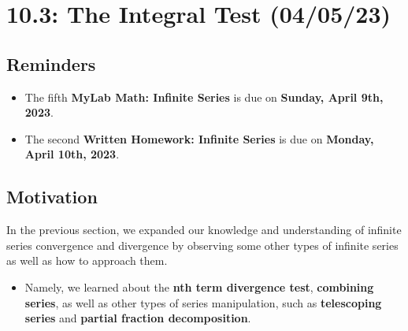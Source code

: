 \documentclass{report}
\begin{document}
\begin{sloppypar}
\begin{center}
{{    }
  }
\end{center}

\begin{center}
\end{center}


\begin{center}
\end{center}


\chapter{10.3: The Integral Test (04/05/23)}
\section{Reminders}
\begin{itemize}
  \item The fifth \textbf{MyLab Math: Infinite Series} is due on
        \textbf{Sunday, April 9th, 2023}.
  \item The second \textbf{Written Homework: Infinite Series} is due on
        \textbf{Monday, April 10th, 2023}.
\end{itemize}

\section{Motivation}
In the previous section, we expanded our knowledge and understanding
of infinite series convergence and divergence by observing some
other types of infinite series as well as how to approach them.
\begin{itemize}
  \item Namely, we learned about the \textbf{nth term divergence test},
        \textbf{combining series}, as well as other types of series
        manipulation, such as \textbf{telescoping series} and
        \textbf{partial fraction decomposition}.


\end{itemize}
\end{sloppypar}
\end{document}
